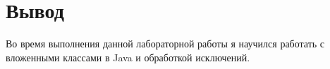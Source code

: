 \section{Вывод}
Во время выполнения данной лабораторной работы я научился работать с
вложенными классами в Java и обработкой исключений.